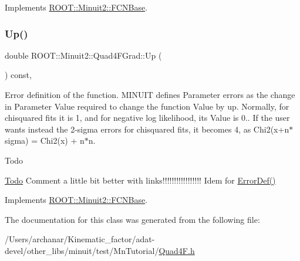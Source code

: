 Implements \mbox{\hyperlink{classROOT_1_1Minuit2_1_1FCNBase_a04ef08ddad92ce8d89d498efbe021c39}{R\+O\+O\+T\+::\+Minuit2\+::\+F\+C\+N\+Base}}.

\mbox{\label{classROOT_1_1Minuit2_1_1Quad4FGrad_a0c477f97bac7a89bea6bdea9fdae92cf}} 
\subsubsection{\texorpdfstring{Up()}{Up()}\hspace{0.1cm}{\footnotesize\ttfamily [2/2]}}
{\footnotesize\ttfamily double R\+O\+O\+T\+::\+Minuit2\+::\+Quad4\+F\+Grad\+::\+Up (\begin{DoxyParamCaption}{ }\end{DoxyParamCaption}) const\hspace{0.3cm}{\ttfamily [inline]}, {\ttfamily [virtual]}}

Error definition of the function. M\+I\+N\+U\+IT defines Parameter errors as the change in Parameter Value required to change the function Value by up. Normally, for chisquared fits it is 1, and for negative log likelihood, its Value is 0.. If the user wants instead the 2-\/sigma errors for chisquared fits, it becomes 4, as Chi2(x+n$\ast$sigma) = Chi2(x) + n$\ast$n.

\begin{DoxyRefDesc}{Todo}
\item[\mbox{\hyperlink{todo__todo000001}{Todo}}]Comment a little bit better with links!!!!!!!!!!!!!!!!! Idem for \mbox{\hyperlink{classROOT_1_1Minuit2_1_1FCNBase_ac4592475c58a65b037ba97ab5f3cba10}{Error\+Def()}}\end{DoxyRefDesc}


Implements \mbox{\hyperlink{classROOT_1_1Minuit2_1_1FCNBase_a04ef08ddad92ce8d89d498efbe021c39}{R\+O\+O\+T\+::\+Minuit2\+::\+F\+C\+N\+Base}}.



The documentation for this class was generated from the following file\+:\begin{DoxyCompactItemize}
\item 
/\+Users/archanar/\+Kinematic\+\_\+factor/adat-\/devel/other\+\_\+libs/minuit/test/\+Mn\+Tutorial/\mbox{\hyperlink{adat-devel_2other__libs_2minuit_2test_2MnTutorial_2Quad4F_8h}{Quad4\+F.\+h}}\end{DoxyCompactItemize}

